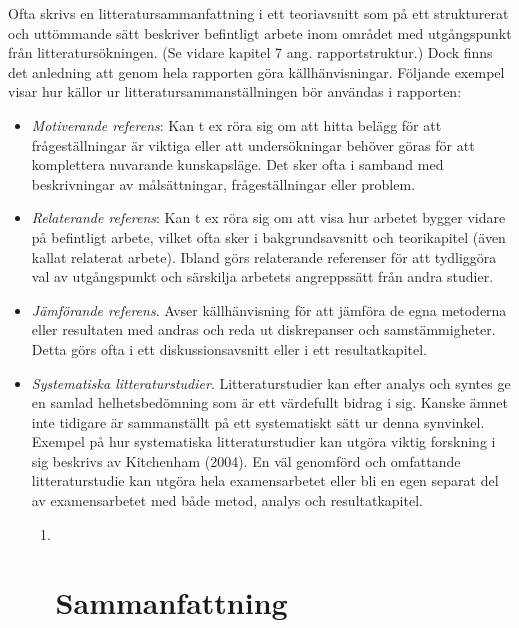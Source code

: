 Ofta skrivs en litteratursammanfattning i ett teoriavsnitt som på ett
strukturerat och uttömmande sätt beskriver befintligt arbete inom
området med utgångspunkt från litteratursökningen. (Se vidare kapitel 7
ang. rapportstruktur.) Dock finns det anledning att genom hela rapporten
göra källhänvisningar. Följande exempel visar hur källor ur
litteratursammanställningen bör användas i rapporten:

\begin{itemize}
\item
  \emph{Motiverande referens}: Kan t ex röra sig om att hitta belägg för
  att frågeställningar är viktiga eller att undersökningar behöver göras
  för att komplettera nuvarande kunskapsläge. Det sker ofta i samband
  med beskrivningar av målsättningar, frågeställningar eller problem.
\item
  \emph{Relaterande referens}: Kan t ex röra sig om att visa hur arbetet
  bygger vidare på befintligt arbete, vilket ofta sker i
  bakgrundsavsnitt och teorikapitel (även kallat relaterat arbete).
  Ibland görs relaterande referenser för att tydliggöra val av
  utgångspunkt och särskilja arbetets angreppssätt från andra studier.
\item
  \emph{Jämförande referens}. Avser källhänvisning för att jämföra de
  egna metoderna eller resultaten med andras och reda ut diskrepanser
  och samstämmigheter. Detta görs ofta i ett diskussionsavsnitt eller i
  ett resultatkapitel.
\item
  \emph{Systematiska litteraturstudier}. Litteraturstudier kan efter
  analys och syntes ge en samlad helhetsbedömning som är ett värdefullt
  bidrag i sig. Kanske ämnet inte tidigare är sammanställt på ett
  systematiskt sätt ur denna synvinkel. Exempel på hur systematiska
  litteraturstudier kan utgöra viktig forskning i sig beskrivs av
  Kitchenham (2004). En väl genomförd och omfattande litteraturstudie
  kan utgöra hela examensarbetet eller bli en egen separat del av
  examensarbetet med både metod, analys och resultatkapitel.

  \begin{enumerate}
  \def\labelenumi{\arabic{enumi}.}
  \item ~
    \section{Sammanfattning}\label{sammanfattning}
  \end{enumerate}
\end{itemize}

